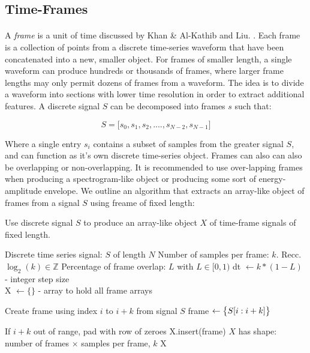 \documentclass[12pt,letterpaper]{article}
\begin{document}


\subsection{Time-Frames}

\paragraph*{}A \textit{frame} is a unit of time discussed by Khan \& Al-Kathib and Liu.  \cite{Kahn 2006,Liu 1998}. Each frame is a collection of points from a discrete time-series waveform that have been concatenated into a new, smaller object. For frames of smaller length, a single waveform can produce hundreds or thousands of frames, where larger frame lengths may only permit dozens of frames from a waveform. The idea is to divide a waveform into sections with lower time resolution in order to extract additional features. A discrete signal $S$ can be decomposed into frames $s$ such that:

\begin{equation}
\label{many frames}
S = \big[ s_0 , s_1 , s_2 , .... , s_{N-2} , s_{N-1} \big]
\end{equation}

Where a single entry $s_i$ contains a subset of samples from the greater signal $S$, and can function as it's own discrete time-series object. Frames can also can also be overlapping or non-overlapping. It is recommended to use over-lapping frames when producing a spectrogram-like object or producing some sort of energy-amplitude envelope. We outline an algorithm that extracts an array-like object of frames from a signal $S$ using freame of fixed length:

\begin{algorithm}
\label{Time-Frames}
\caption{Use discrete signal $S$ to produce an array-like object $X$ of time-frame signals of fixed length.}
\begin{algorithmic}
\REQUIRE Discrete time series signal: $S$ of length $N$
\REQUIRE Number of samples per frame: $k$. Recc. $\log_2(k) \in \mathbb{Z}$
\REQUIRE Percentage of frame overlap: $L$ with $L \in [0,1)$
dt $\leftarrow k * (1 - L)$ - integer step size \\
X $\leftarrow \{\}$ - array to hold all frame arrays \\

	\item Create frame using index $i$ to $i+k$ from signal $S$
	\STATE frame $\leftarrow \big{\{} S[i:i+k] \big{\}}$ 
	\item If $i+k$ out of range, pad with row of zeroes
	\STATE X.insert(frame)
\ENDFOR
\ENSURE $X$ has shape: number of frames $\times$ samples per frame, $k$
\RETURN X

\end{algorithmic}
\end{algorithm}
\end{document}
